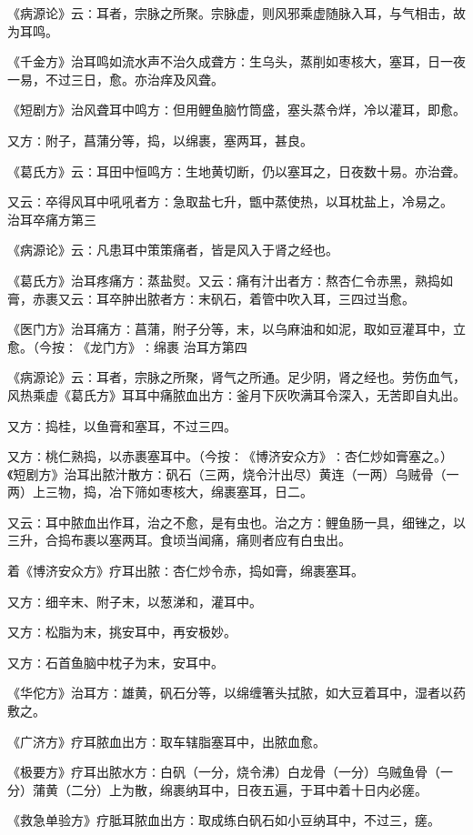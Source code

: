\documentclass[a4paper,12pt,UTF8,twoside]{ctexbook}
\begin{document}
《病源论》云∶耳者，宗脉之所聚。宗脉虚，则风邪乘虚随脉入耳，与气相击，故为耳鸣。

《千金方》治耳鸣如流水声不治久成聋方∶生乌头，蒸削如枣核大，塞耳，日一夜一易，不过三日，愈。亦治痒及风聋。

《短剧方》治风聋耳中鸣方∶但用鲤鱼脑竹筒盛，塞头蒸令烊，冷以灌耳，即愈。

又方∶附子，菖蒲分等，捣，以绵裹，塞两耳，甚良。

《葛氏方》云∶耳田中恒鸣方∶生地黄切断，仍以塞耳之，日夜数十易。亦治聋。

又云∶卒得风耳中吼吼者方∶急取盐七升，甑中蒸使热，以耳枕盐上，冷易之。
治耳卒痛方第三

《病源论》云∶凡患耳中策策痛者，皆是风入于肾之经也。

《葛氏方》治耳疼痛方∶蒸盐熨。又云∶痛有汁出者方∶熬杏仁令赤黑，熟捣如膏，赤裹又云∶耳卒肿出脓者方∶末矾石，着管中吹入耳，三四过当愈。

《医门方》治耳痛方∶菖蒲，附子分等，末，以乌麻油和如泥，取如豆灌耳中，立愈。（今按∶《龙门方》∶绵裹
治耳方第四

《病源论》云∶耳者，宗脉之所聚，肾气之所通。足少阴，肾之经也。劳伤血气，风热乘虚《葛氏方》耳耳中痛脓血出方∶釜月下灰吹满耳令深入，无苦即自丸出。

又方∶捣桂，以鱼膏和塞耳，不过三四。

又方∶桃仁熟捣，以赤裹塞耳中。（今按∶《博济安众方》∶杏仁炒如膏塞之。）《短剧方》治耳出脓汁散方∶矾石（三两，烧令汁出尽）黄连（一两）乌贼骨（一两）上三物，捣，冶下筛如枣核大，绵裹塞耳，日二。

又云∶耳中脓血出作耳，治之不愈，是有虫也。治之方∶鲤鱼肠一具，细锉之，以三升，合捣布裹以塞两耳。食顷当闻痛，痛则者应有白虫出。

着《博济安众方》疗耳出脓∶杏仁炒令赤，捣如膏，绵裹塞耳。

又方∶细辛末、附子末，以葱涕和，灌耳中。

又方∶松脂为末，挑安耳中，再安极妙。

又方∶石首鱼脑中枕子为末，安耳中。

《华佗方》治耳方∶雄黄，矾石分等，以绵缠箸头拭脓，如大豆着耳中，湿者以药敷之。

《广济方》疗耳脓血出方∶取车辖脂塞耳中，出脓血愈。

《极要方》疗耳出脓水方∶白矾（一分，烧令沸）白龙骨（一分）乌贼鱼骨（一分）蒲黄（二分）上为散，绵裹纳耳中，日夜五遍，于耳中着十日内必瘥。

《救急单验方》疗胝耳脓血出方∶取成练白矾石如小豆纳耳中，不过三，瘥。
\end{document}
